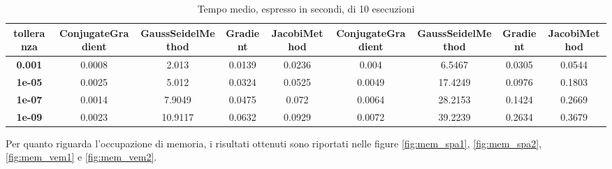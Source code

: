 \begin{table}[!ht]
\begin{subtable}[!ht]{1\textwidth}
{\begin{tabular}{@{}ccccc|cccc@{}}
                \textbf{tolleranza} & \textbf{ConjugateGradient}         & \textbf{GaussSeidelMethod}        & \textbf{Gradient} & \textbf{JacobiMethod} & \textbf{ConjugateGradient} & \textbf{GaussSeidelMethod} & \textbf{Gradient} & \textbf{JacobiMethod} \\ \midrule
                \textbf{0.001}      & 0.0008                             & 2.013                             & 0.0139            & 0.0236                & 0.004                      & 6.5467                     & 0.0305            & 0.0544                \\
                \textbf{1e-05}      & 0.0025                             & 5.012                             & 0.0324            & 0.0525                & 0.0049                     & 17.4249                    & 0.0976            & 0.1803                \\
                \textbf{1e-07}      & 0.0014                             & 7.9049                            & 0.0475            & 0.072                 & 0.0064                     & 28.2153                    & 0.1424            & 0.2669                \\
                \textbf{1e-09}      & 0.0023                             & 10.9117                           & 0.0632            & 0.0929                & 0.0072                     & 39.2239                    & 0.2634            & 0.3679                \\ \bottomrule
            \end{tabular}}
        \caption{Vem 1 e Vem 2}
        \label{tab:vem_time}
    \end{subtable}
    \caption{Tempo medio, espresso in secondi, di 10 esecuzioni}
    \label{tab:times}
\end{table}

Per quanto riguarda l'occupazione di memoria, i risultati ottenuti sono riportati
nelle figure \ref{fig:mem_spa1}, \ref{fig:mem_spa2}, \ref{fig:mem_vem1} e \ref{fig:mem_vem2}.

